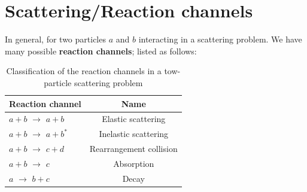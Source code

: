\section{Scattering/Reaction channels}
In general, for two particles $a$ and $b$ interacting in a scattering problem. We have many possible \textbf{reaction channels}; listed as follows:
\begin{table}[h!]
	\centering
	\begin{tabular}{|l|c|}
		\hline
		Reaction channel& Name\\
		\hline
		$a+b$  $\longrightarrow$  $ a+b$ & Elastic scattering \\
		$a+b$  $\longrightarrow$  $ a+b^*$ & Inelastic scattering \\
		$a+b$  $\longrightarrow$  $ c+d$ & Rearrangement collision \\
		$a+b$  $\longrightarrow$  $ c$ & Absorption \\
		$a$  $\longrightarrow$  $ b+c$ & Decay\\
		\hline
	\end{tabular}
	\caption{Classification of the reaction channels in a tow-particle scattering problem}
\end{table}
